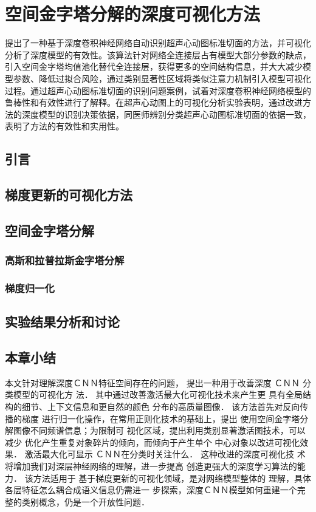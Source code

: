 \chapter{空间金字塔分解的深度可视化方法}
\label{chap:visualization}

 提出了一种基于深度卷积神经网络自动识别超声心动图标准切面的方法，并可视化分析了深度模型的有效性。该算法针对网络全连接层占有模型大部分参数的缺点，引入空间金字塔均值池化替代全连接层，获得更多的空间结构信息，并大大减少模型参数、降低过拟合风险，通过类别显著性区域将类似注意力机制引入模型可视化过程。通过超声心动图标准切面的识别问题案例，试着对深度卷积神经网络模型的鲁棒性和有效性进行了解释。在超声心动图上的可视化分析实验表明，通过改进方法的深度模型的识别决策依据，同医师辨别分类超声心动图标准切面的依据一致，表明了方法的有效性和实用性。

\section{引言}

 
\section{梯度更新的可视化方法}

 
\section{空间金字塔分解}
\subsection{高斯和拉普拉斯金字塔分解}
\subsection{梯度归一化}
 
\section{实验结果分析和讨论}
\section{本章小结}
本文针对理解深度ＣＮＮ特征空间存在的问题，
提出一种用于改善深度 ＣＮＮ 分类模型的可视化方 法． 其中通过改善激活最大化可视化技术来产生更 具有全局结构的细节、上下文信息和更自然的颜色 分布的高质量图像． 该方法首先对反向传播的梯度 进行归一化操作，在常用正则化技术的基础上，提出 使用空间金字塔分解图像不同频谱信息；为限制可 视化区域，提出利用类别显著激活图技术，可以减少 优化产生重复对象碎片的倾向，而倾向于产生单个 中心对象以改进可视化效果． 激活最大化可显示
ＣＮＮ在分类时关注什么． 这种改进的深度可视化技 术将增加我们对深层神经网络的理解，进一步提高 创造更强大的深度学习算法的能力． 该方法适用于 基于梯度更新的可视化领域，是对网络模型整体的 理解，具体各层特征怎么耦合成语义信息仍需进一 步探索，深度ＣＮＮ模型如何重建一个完整的类别概念，仍是一个开放性问题．